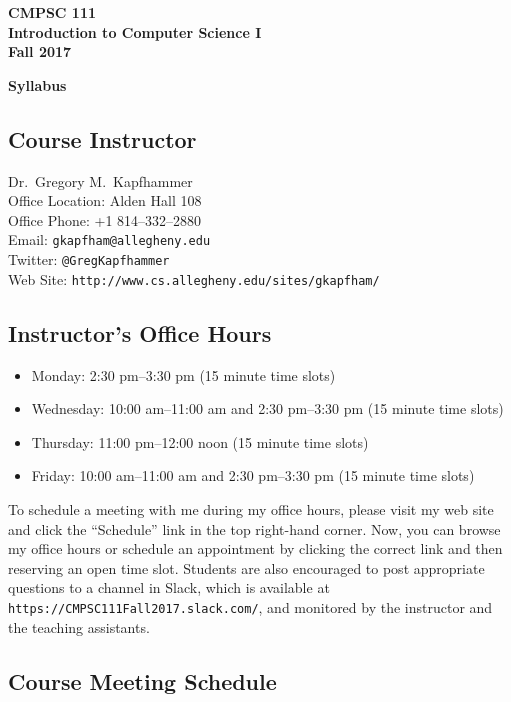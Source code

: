 \documentclass[11pt]{article}
\newcommand{\url}[1]{\lstinline{#1}}
\newcommand{\syllabustitle}[1]
{
  \begin{center}
    \begin{center}
      \bf
      CMPSC 111\\Introduction to Computer Science I\\
      Fall 2017\\
      \medskip
    \end{center}
    \bf
    #1
  \end{center}
}
\begin{document}
\thispagestyle{empty}

\syllabustitle{Syllabus}

\vspace*{-.1in}
\subsection*{Course Instructor}
Dr.\ Gregory M.\ Kapfhammer\\
\noindent Office Location: Alden Hall 108 \\
\noindent Office Phone: +1 814--332--2880 \\
\noindent Email: \url{gkapfham@allegheny.edu} \\
\noindent Twitter: \url{@GregKapfhammer} \\
\noindent Web Site: \url{http://www.cs.allegheny.edu/sites/gkapfham/}

\subsection*{Instructor's Office Hours}

\begin{itemize}
  \itemsep0em

  \item Monday: 2:30 pm--3:30 pm (15 minute time slots)

  \item Wednesday: 10:00 am--11:00 am and 2:30 pm--3:30 pm (15 minute time slots)

  \item Thursday: 11:00 pm--12:00 noon (15 minute time slots)

  \item Friday: 10:00 am--11:00 am and 2:30 pm--3:30 pm (15 minute time slots)

\end{itemize}

\vspace*{-.1in}

\noindent To schedule a meeting with me during my office hours, please visit my web site and click the ``Schedule'' link
in the top right-hand corner. Now, you can browse my office hours or schedule an appointment by clicking the correct
link and then reserving an open time slot. Students are also encouraged to post appropriate questions to a channel in
Slack, which is available at \url{https://CMPSC111Fall2017.slack.com/}, and monitored by the instructor and the
teaching assistants.

\subsection*{Course Meeting Schedule}
\end{document}
